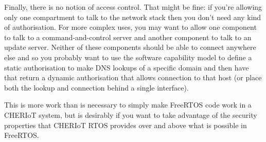 Finally, there is no notion of access control.
That might be fine: if you're allowing only one compartment to talk to the network stack then you don't need any kind of authorisation.
For more complex uses, you may want to allow one component to talk to a command-and-control server and another component to talk to an update server.
Neither of these components should be able to connect anywhere else and so you probably want to use the software capability model to define a static authorisation to make DNS lookups of a specific domain and then have that return a dynamic authorisation that allows connection to that host (or place both the lookup and connection behind a single interface).

This is more work than is necessary to simply make FreeRTOS code work in a CHERIoT system, but is desirably if you want to take advantage of the security properties that CHERIoT RTOS provides over and above what is possible in FreeRTOS.
